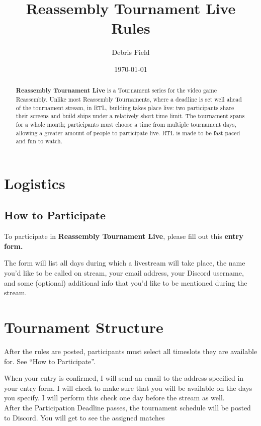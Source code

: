 \documentclass[11pt]{article}
\newcommand{\RTL}{\textbf{Reassembly Tournament Live}}
\begin{document}
\title{Reassembly Tournament Live Rules}
\author{Debris Field}
\date{\today}
\maketitle

\begin{abstract}
\RTL{} is a Tournament
series for the video game Reassembly. Unlike most Reassembly Tournaments, where
a deadline is set well ahead of the tournament stream, in RTL,
building takes place live: two participants share their screens and
build ships under a relatively short time limit. The tournament spans
for a whole month; participants must choose a time from multiple
tournament days, allowing a greater amount of people to participate live.
RTL is made to be fast paced and fun to watch.
\end{abstract}

\tableofcontents

\section{Logistics}
\subsection{How to Participate}
To participate in \RTL{}, please fill out this \textbf{entry form.}

The form will list all days during which a livestream will take place, the name you'd like to
be called on stream, your email address, your Discord username, and 
some (optional) additional info that you'd like to be mentioned during the stream.

\section{Tournament Structure}
After the rules are posted, participants must select all timeslots they are available for.
See ``How to Participate''.

When your entry is confirmed, I will send an email to the address specified in your entry form.
I will check to make sure that you will be available on the days you specify.
I will perform this check one day before the stream as well.\\

After the Participation Deadline passes, the tournament schedule will be posted to Discord.
You will get to see the assigned matches 
\end{document}
